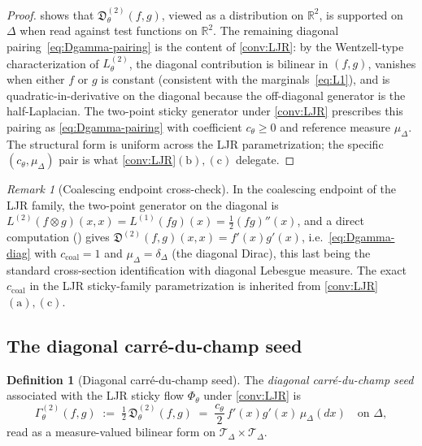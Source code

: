 \documentclass[11pt,reqno]{amsart}
\theoremstyle{plain}
\theoremstyle{definition}
\newtheorem{definition}[theorem]{Definition}
\theoremstyle{remark}
\newtheorem{remark}[theorem]{Remark}
\newcommand{\R}{\mathbb{R}}
\newcommand{\cT}{\mathcal T}
\begin{document}
\begin{proof}
 shows that $\mathfrak D^{(2)}_{\theta}(f,g)$,
viewed as a distribution on $\R^{2}$, is supported on $\Delta$
when read against test functions on $\R^{2}$. The remaining
diagonal pairing~\eqref{eq:Dgamma-pairing} is the content of
\cref{conv:LJR}: by the Wentzell-type characterization of
$L^{(2)}_{\theta}$, the diagonal contribution is bilinear in
$(f,g)$, vanishes when either $f$ or $g$ is constant
(consistent with the marginals~\eqref{eq:L1}), and is
quadratic-in-derivative on the diagonal because the off-diagonal
generator is the half-Laplacian. The two-point sticky generator
under \cref{conv:LJR} prescribes this pairing as
\eqref{eq:Dgamma-pairing} with coefficient $c_{\theta}\ge 0$ and
reference measure $\mu_{\Delta}$. The structural form is uniform
across the LJR parametrization; the specific
$(c_{\theta},\mu_{\Delta})$ pair is what
\cref{conv:LJR}$(\mathrm b),(\mathrm c)$ delegate.
\end{proof}

\begin{remark}[Coalescing endpoint cross-check]\label{rem:coalescing-check}
In the coalescing endpoint of the LJR family, the two-point
generator on the diagonal is
$L^{(2)}(f\otimes g)(x,x)=L^{(1)}(fg)(x)=\tfrac{1}{2}(fg)''(x)$,
and a direct computation
(\cite[Prop.~6.10]{PrimitiveDivergence})
gives
$\mathfrak D^{(2)}(f,g)(x,x)=f'(x)g'(x)$,
i.e.\ \eqref{eq:Dgamma-diag} with
$c_{\mathrm{coal}}=1$ and $\mu_{\Delta}=\delta_{\Delta}$ (the
diagonal Dirac), this last being the standard cross-section
identification with diagonal Lebesgue measure. The exact
$c_{\mathrm{coal}}$ in the LJR sticky-family parametrization is
inherited from \cref{conv:LJR}$(\mathrm a),(\mathrm c)$.
\end{remark}

\subsection{The diagonal carr\'e-du-champ seed}\label{sec:Gamma-seed}

\begin{definition}[Diagonal carr\'e-du-champ seed]\label{def:Gamma-theta}
The \emph{diagonal carr\'e-du-champ seed} associated with the
LJR sticky flow $\Phi_{\theta}$ under \cref{conv:LJR} is
\begin{equation}\label{eq:Gamma-theta}
  \Gamma^{(2)}_{\theta}(f,g)
  \;:=\;\tfrac{1}{2}\,\mathfrak D^{(2)}_{\theta}(f,g)
  \;=\;\frac{c_{\theta}}{2}\,f'(x)g'(x)\,\mu_{\Delta}(dx)
  \quad\text{on }\Delta,
\end{equation}
read as a measure-valued bilinear form on
$\cT_{\Delta}\times\cT_{\Delta}$.
\end{definition}
\end{document}
